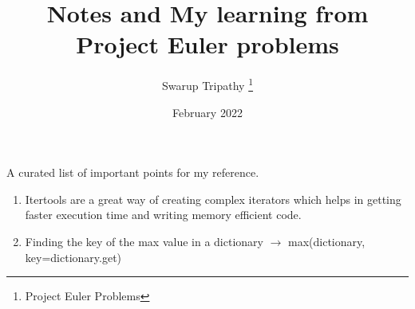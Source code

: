 \documentclass[11pt]{article}
\title{Notes and My learning from Project Euler problems}
\author{Swarup Tripathy \thanks{Project Euler Problems}}
\date{February 2022}
\begin{document}
    \maketitle
    A curated list of important points for my reference.\\
    \begin{enumerate}
        \item Itertools are a great way of creating complex iterators which helps in getting faster execution time and writing memory efficient code.
        \item Finding the key of the max value in a dictionary $\rightarrow$ max(dictionary, key=dictionary.get)
    \end{enumerate}
\end{document}
